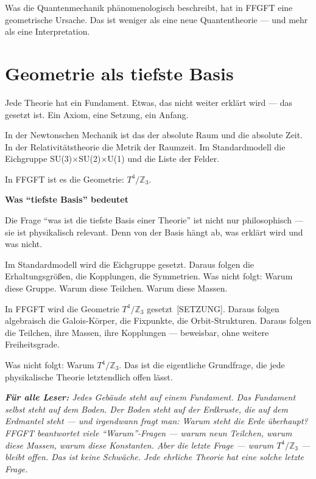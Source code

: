 \documentclass[11pt,oneside]{book}
\newcommand{\status}[1]{\penalty10000\,{\scriptsize\textcolor{gray!60}{[#1]}}}
\newenvironment{laierspur}{%
  \par\vspace{4pt}%
  \noindent\small\itshape\color{blue!60!black}%
  \textbf{Für alle Leser:}\enspace\ignorespaces}{%
  \par\vspace{4pt}\normalsize\normalfont\normalcolor}
\begin{document}
Was die Quantenmechanik phänomenologisch beschreibt, hat in FFGFT eine
geometrische Ursache. Das ist weniger als eine neue Quantentheorie — und
mehr als eine Interpretation.

\chapter{Geometrie als tiefste Basis}

Jede Theorie hat ein Fundament. Etwas, das nicht weiter erklärt wird —
das gesetzt ist. Ein Axiom, eine Setzung, ein Anfang.


In der Newtonschen Mechanik ist das der absolute Raum und die absolute
Zeit. In der Relativitätstheorie die Metrik der Raumzeit. Im
Standardmodell die Eichgruppe SU(3)$\times$SU(2)$\times$U(1) und die Liste der
Felder.


In FFGFT ist es die Geometrie: $T^4/\mathbb{Z}_3$.


\textbf{Was \enquote{tiefste Basis} bedeutet}


Die Frage \enquote{was ist die tiefste Basis einer Theorie} ist nicht nur
philosophisch — sie ist physikalisch relevant. Denn von der Basis hängt
ab, was erklärt wird und was nicht.


Im Standardmodell wird die Eichgruppe gesetzt. Daraus folgen die
Erhaltungsgrößen, die Kopplungen, die Symmetrien. Was nicht folgt:
Warum diese Gruppe. Warum diese Teilchen. Warum diese Massen.


In FFGFT wird die Geometrie $T^4/\mathbb{Z}_3$ gesetzt \status{SETZUNG}. Daraus folgen
algebraisch die Galois-Körper, die Fixpunkte, die Orbit-Strukturen.
Daraus folgen die Teilchen, ihre Massen, ihre Kopplungen — beweisbar,
ohne weitere Freiheitsgrade.


Was nicht folgt: Warum $T^4/\mathbb{Z}_3$. Das ist die eigentliche Grundfrage,
die jede physikalische Theorie letztendlich offen lässt.


\begin{laierspur}
Jedes Gebäude steht auf einem Fundament. Das Fundament
selbst steht auf dem Boden. Der Boden steht auf der Erdkruste,
die auf dem Erdmantel steht — und irgendwann fragt man: Warum
steht die Erde überhaupt? FFGFT beantwortet viele \enquote{Warum}-Fragen —
warum neun Teilchen, warum diese Massen, warum diese Konstanten.
Aber die letzte Frage — warum $T^4/\mathbb{Z}_3$ — bleibt offen. Das ist
keine Schwäche. Jede ehrliche Theorie hat eine solche letzte Frage.
\end{laierspur}
\end{document}

